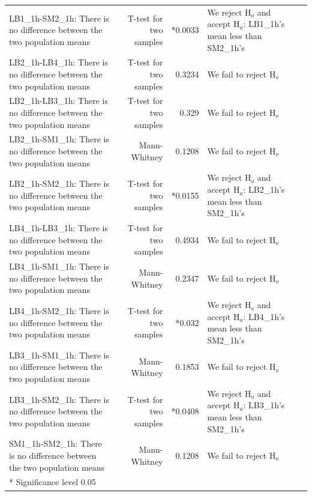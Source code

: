 \begin{table}[H]
{\begin{tabular}{>{\RaggedRight}p{5.5cm}rr>{\RaggedRight}p{5.5cm}r}
LB1\_1h-SM2\_1h: There is no difference between the two population means & T-test for two samples & *0.0033 & We reject $\text{H}_o$ and accept $\text{H}_a$: LB1\_1h's mean less than SM2\_1h's \\
LB2\_1h-LB4\_1h: There is no difference between the two population means & T-test for two samples & 0.3234 & We fail to reject $\text{H}_o$ \\
LB2\_1h-LB3\_1h: There is no difference between the two population means & T-test for two samples & 0.329 & We fail to reject $\text{H}_o$ \\
LB2\_1h-SM1\_1h: There is no difference between the two population means & Mann-Whitney & 0.1208 & We fail to reject $\text{H}_o$ \\
LB2\_1h-SM2\_1h: There is no difference between the two population means & T-test for two samples & *0.0155 & We reject $\text{H}_o$ and accept $\text{H}_a$: LB2\_1h's mean less than SM2\_1h's \\
LB4\_1h-LB3\_1h: There is no difference between the two population means & T-test for two samples & 0.4934 & We fail to reject $\text{H}_o$ \\
LB4\_1h-SM1\_1h: There is no difference between the two population means & Mann-Whitney & 0.2347 & We fail to reject $\text{H}_o$ \\
LB4\_1h-SM2\_1h: There is no difference between the two population means & T-test for two samples & *0.032 & We reject $\text{H}_o$ and accept $\text{H}_a$: LB4\_1h's mean less than SM2\_1h's \\
LB3\_1h-SM1\_1h: There is no difference between the two population means & Mann-Whitney & 0.1853 & We fail to reject $\text{H}_o$ \\
LB3\_1h-SM2\_1h: There is no difference between the two population means & T-test for two samples & *0.0408 & We reject $\text{H}_o$ and accept $\text{H}_a$: LB3\_1h's mean less than SM2\_1h's \\
SM1\_1h-SM2\_1h: There is no difference between the two population means & Mann-Whitney & 0.1208 & We fail to reject $\text{H}_o$ \\
\bottomrule
*  Significance level 0.05
\end{tabular}
}
\end{table}


